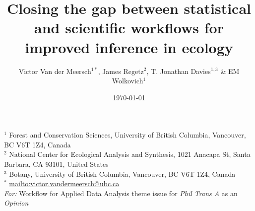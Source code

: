 \documentclass[11pt]{article}
\begin{document}
\title{Closing the gap between statistical and scientific workflows for improved inference in ecology} 
\date{\today}
\author{Victor Van der Meersch$^{1*}$, James Regetz$^{2}$, T. Jonathan Davies$^{1,3}$ \& EM Wolkovich$^{1}$}
\maketitle
\noindent $^{1}$ Forest and Conservation Sciences, University of British Columbia, Vancouver, BC V6T 1Z4, Canada\\
$^{2}$ National Center for Ecological Analysis and Synthesis, 1021 Anacapa St, Santa Barbara, CA 93101, United States\\
$^{3}$ Botany, University of British Columbia, Vancouver, BC V6T 1Z4, Canada \\
$^{*}$ \url{mailto:victor.vandermeersch@ubc.ca}\\

\noindent \emph{For:} Workflow for Applied Data Analysis theme issue for \emph{Phil Trans A} as an \emph{Opinion}
\end{document}
